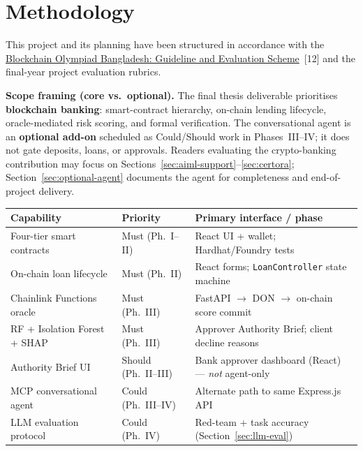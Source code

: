 \documentclass[12pt, a4paper]{report}
\newcommand{\tableheadcolor}{\rowcolor{TableHeadBg}}
\begin{document}
\chapter{Methodology}

This project and its planning have been structured in accordance with the \href{https://bcolbd.org/uploads/guideline/BLOCKCHAIN\%20OLYMPIAD\%20BANGLADESH\%20Blockchain\%20Guideline.pdf}{Blockchain Olympiad Bangladesh: Guideline and Evaluation Scheme}~[12] and the final-year project evaluation rubrics.

\noindent\textbf{Scope framing (core vs.\ optional).} The final thesis deliverable prioritises \textbf{blockchain banking}: smart-contract hierarchy, on-chain lending lifecycle, oracle-mediated risk scoring, and formal verification. The conversational agent is an \textbf{optional add-on} scheduled as Could/Should work in Phases~III--IV; it does not gate deposits, loans, or approvals. Readers evaluating the crypto-banking contribution may focus on Sections~\ref{sec:aiml-support}--\ref{sec:certora}; Section~\ref{sec:optional-agent} documents the agent for completeness and end-of-project delivery.

\begin{table}[H]
\centering
\begin{tabular}{p{3.2cm}p{2.2cm}p{7.8cm}}
\toprule
\tableheadcolor
\textbf{Capability} & \textbf{Priority} & \textbf{Primary interface / phase} \\
\midrule
Four-tier smart contracts & Must (Ph.~I--II) & React UI + wallet; Hardhat/Foundry tests \\
On-chain loan lifecycle & Must (Ph.~II) & React forms; \texttt{LoanController} state machine \\
Chainlink Functions oracle & Must (Ph.~III) & FastAPI $\to$ DON $\to$ on-chain score commit \\
RF + Isolation Forest + SHAP & Must (Ph.~III) & Approver Authority Brief; client decline reasons \\
Authority Brief UI & Should (Ph.~II--III) & Bank approver dashboard (React) --- \textit{not} agent-only \\
MCP conversational agent & Could (Ph.~III--IV) & Alternate path to same Express.js API \\
LLM evaluation protocol & Could (Ph.~IV) & Red-team + task accuracy (Section~\ref{sec:llm-eval}) \\
\bottomrule
\end{tabular}
\end{table}
\end{document}
